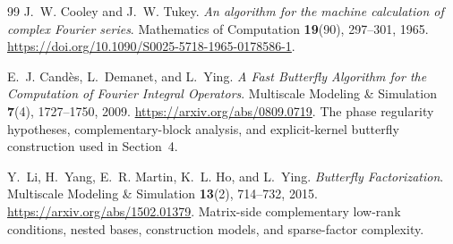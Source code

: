 \documentclass[11pt,a4paper]{article}
\numberwithin{equation}{section}
\begin{document}
\begin{thebibliography}{99}
J.~W. Cooley and J.~W. Tukey.
\emph{An algorithm for the machine calculation of complex Fourier series}.
Mathematics of Computation \textbf{19}(90), 297--301, 1965.
\url{https://doi.org/10.1090/S0025-5718-1965-0178586-1}.

E.~J. Cand\`{e}s, L.~Demanet, and L.~Ying.
\emph{A Fast Butterfly Algorithm for the Computation of Fourier Integral Operators}.
Multiscale Modeling \& Simulation \textbf{7}(4), 1727--1750, 2009.
\url{https://arxiv.org/abs/0809.0719}.
The phase regularity hypotheses, complementary-block analysis, and explicit-kernel butterfly construction used in Section~4.

Y.~Li, H.~Yang, E.~R. Martin, K.~L. Ho, and L.~Ying.
\emph{Butterfly Factorization}.
Multiscale Modeling \& Simulation \textbf{13}(2), 714--732, 2015.
\url{https://arxiv.org/abs/1502.01379}.
Matrix-side complementary low-rank conditions, nested bases, construction models, and sparse-factor complexity.
\end{thebibliography}
\end{document}
